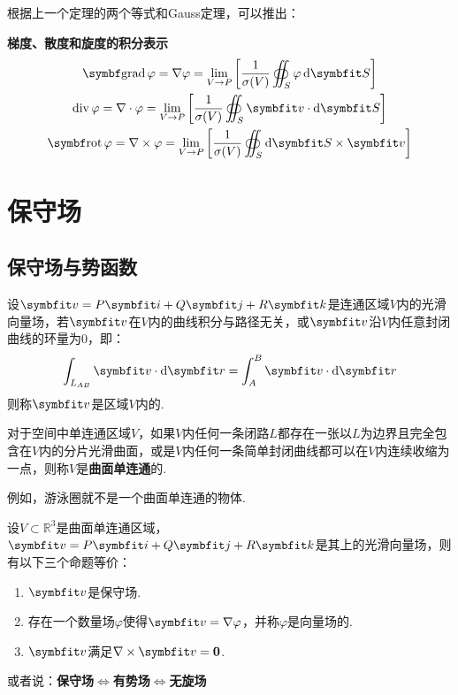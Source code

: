 根据上一个定理的两个等式和Gauss定理，可以推出：
\begin{theorem}
    \textbf{梯度、散度和旋度的积分表示}
    \begin{gather*}
        \grad\varphi = \nabla\varphi = \lim_{V\to P}\left[\frac{1}{\sigma(V)}\oiint_S\varphi\dd{\vb{S}}\right]\\
        \operatorname{div}\varphi = \nabla\cdot\varphi = \lim_{V\to P}\left[\frac{1}{\sigma(V)}\oiint_S\vb{v}\cdot\dd{\vb{S}}\right]\\
        \rot\varphi = \nabla\times\varphi = \lim_{V\to P}\left[\frac{1}{\sigma(V)}\oiint_S\dd{\vb{S}}\times\vb{v}\right]
    \end{gather*}
\end{theorem}


\section{保守场}
\subsection{保守场与势函数}
\begin{definition}
    设$\vb{v}=P\vb{i}+Q\vb{j}+R\vb{k}$是连通区域$V$内的光滑向量场，若$\vb{v}$在$V$内的曲线积分与路径无关，或$\vb{v}$沿$V$内任意封闭曲线的环量为$0$，即：
    \[\int_{L_{AB}}\vb{v}\cdot\dd{\vb{r}} = \int_{A}^{B}\vb{v}\cdot\dd{\vb{r}}\]
    则称$\vb{v}$是区域$V$内的.
\end{definition}

\begin{definition}
    对于空间中单连通区域$V$，如果$V$内任何一条闭路$L$都存在一张以$L$为边界且完全包含在$V$内的分片光滑曲面，或是$V$内任何一条简单封闭曲线都可以在$V$内连续收缩为一点，则称$V$是\textbf{曲面单连通}的.
\end{definition}
例如，游泳圈就不是一个曲面单连通的物体.

\begin{theorem}
    设$V\subset\mathbb{R}^3$是曲面单连通区域，$\vb{v}=P\vb{i}+Q\vb{j}+R\vb{k}$是其上的光滑向量场，则有以下三个命题等价：
    \begin{enumerate}[circ]
        \item $\vb{v}$是保守场.
        \item 存在一个数量场$\varphi$使得$\vb{v}=\nabla\varphi$，并称$\varphi$是向量场的.
        \item $\vb{v}$满足$\nabla\times\vb{v}=\bm{0}$.
    \end{enumerate}
    或者说：\textbf{保守场}$\Leftrightarrow$\textbf{有势场}$\Leftrightarrow$\textbf{无旋场}
\end{theorem}

